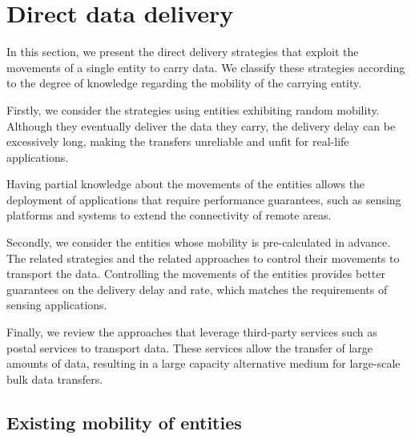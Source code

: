 \section{Direct data delivery}
\label{sec:direct-delivery}

In this section, we present the direct delivery strategies that exploit the movements of a single entity to carry data. We classify these strategies according to the degree of knowledge regarding the mobility of the carrying entity. 

Firstly, we consider the strategies using entities exhibiting random mobility. Although they eventually deliver the data they carry, the delivery delay can be excessively long, making the transfers unreliable and unfit for real-life applications. 

Having partial knowledge about the movements of the entities allows the deployment of applications that require performance guarantees, such as sensing platforms and systems to extend the connectivity of remote areas. 

Secondly, we consider the entities whose mobility is pre-calculated in advance. The related strategies and the related approaches to control their movements to transport the data. Controlling the movements of the entities provides better guarantees on the delivery delay and rate, which matches the requirements of sensing applications. 

Finally, we review the approaches that leverage third-party services such as postal services to transport data. These services allow the transfer of large amounts of data, resulting in a large capacity alternative medium for large-scale bulk data transfers.

\subsection{Existing mobility of entities}
\label{sec:direct-non-control}

